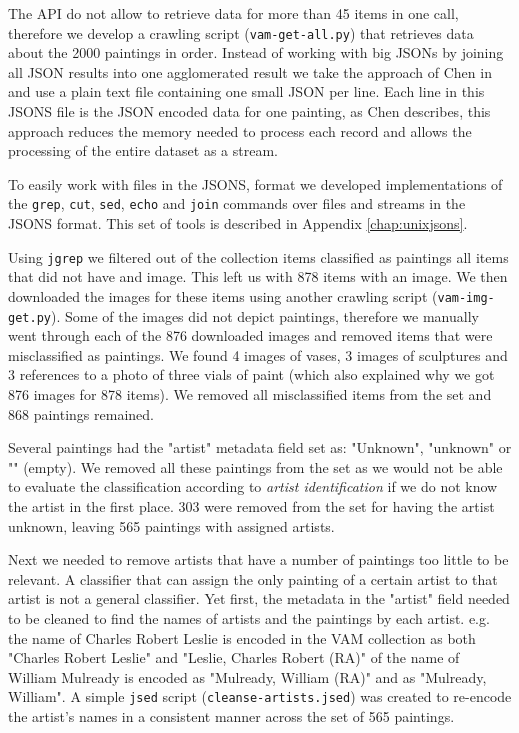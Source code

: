 \documentclass[11pt,a4paper,twoside,openright,draft]{report}
\begin{document}
\begin{multicols}{2}
The API do not allow to retrieve data for more than 45 items in one call,
therefore we develop a crawling script (\texttt{vam-get-all.py}) that retrieves
data about the 2000 paintings in order.  Instead of working with big JSONs by
joining all JSON results into one agglomerated result we take the approach of
Chen in \cite{chen09yahoo} and use a plain text file containing one small JSON
per line.  Each line in this JSONS file is the JSON encoded data for one
painting, as Chen \cite{chen09yahoo} describes, this approach reduces the
memory needed to process each record and allows the processing of the entire
dataset as a stream.

To easily work with files in the JSONS, format we developed implementations of
the \texttt{grep}, \texttt{cut}, \texttt{sed}, \texttt{echo} and \texttt{join}
commands over files and streams in the JSONS format.  This set of tools is
described in Appendix \ref{chap:unixjsons}.

Using \texttt{jgrep} we filtered out of the collection items classified as
paintings all items that did not have and image.  This left us with 878 items
with an image.  We then downloaded the images for these items using another
crawling script (\texttt{vam-img-get.py}).  Some of the images did not depict
paintings, therefore we manually went through each of the 876 downloaded images
and removed items that were misclassified as paintings.  We found 4 images of
vases, 3 images of sculptures and 3 references to a photo of three vials of
paint (which also explained why we got 876 images for 878 items).  We removed
all misclassified items from the set and 868 paintings remained.

Several paintings had the "artist" metadata field set as: "Unknown", "unknown"
or "" (empty).  We removed all these paintings from the set as we would not be
able to evaluate the classification according to \emph{artist identification}
if we do not know the artist in the first place.  303 were removed from the set
for having the artist unknown, leaving 565 paintings with assigned artists.

Next we needed to remove artists that have a number of paintings too little to
be relevant.  A classifier that can assign the only painting of a certain
artist to that artist is not a general classifier.  Yet first, the metadata in
the "artist" field needed to be cleaned to find the names of artists and the
paintings by each artist.  e.g. the name of Charles Robert Leslie is encoded in
the VAM collection as both "Charles Robert Leslie" and "Leslie, Charles Robert
(RA)" of the name of William Mulready is encoded as "Mulready, William (RA)"
and as "Mulready, William".  A simple \texttt{jsed} script
(\texttt{cleanse-artists.jsed}) was created to re-encode the artist's names in
a consistent manner across the set of 565 paintings.


\end{multicols}
\end{document}
